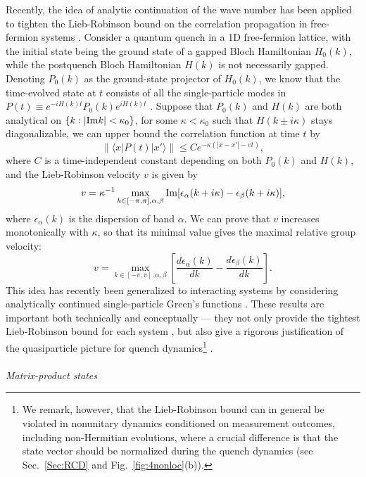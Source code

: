 \documentclass{tADP2e}
\theoremstyle{plain}
\theoremstyle{plain}
\theoremstyle{definition}
\begin{document}
Recently, the idea of analytic continuation of the wave number has been applied to {tighten} the %
Lieb-Robinson bound on the correlation propagation in free-fermion systems \cite{ZG2019}. Consider a quantum quench in a 1D free-fermion lattice, with the initial state being the ground state of a gapped Bloch Hamiltonian $H_0(k)$, while the postquench Bloch Hamiltonian $H(k)$ is not necessarily gapped. Denoting $P_0(k)$ as the ground-state projector of $H_0(k)$, we know that the time-evolved state at $t$ consists of all the single-particle modes in $P(t)\equiv e^{-iH(k)t}P_0(k)e^{iH(k)t}$ \cite{GZ18}. Suppose that $P_0(k)$ and $H(k)$ are both analytical on $\{k:|{\rm Im}k|<\kappa_0\}$, for some $\kappa<\kappa_0$ such that $H(k\pm i\kappa)$ stays diagonalizable, we can upper bound the correlation function at time $t$ by \cite{ZG2019}
\begin{equation}
\|\langle x| P(t) | x'\rangle\|\le C e^{-\kappa (|x-x'|-vt)},
\end{equation}
where $C$ is a time-independent constant depending on both $P_0(k)$ and $H(k)$, and the Lieb-Robinson velocity $v$ is given by
\begin{equation}
v=\kappa^{-1}\max_{k\in[-\pi,\pi],\alpha,\beta}{\rm Im}[\epsilon_\alpha(k+i\kappa)-\epsilon_\beta(k+i\kappa)],
\end{equation}
where $\epsilon_\alpha(k)$ is the dispersion of band $\alpha$. We can prove that $v$ increases monotonically with $\kappa$, so that its minimal value gives the maximal {relative} group velocity:
\begin{equation}
v=\max_{k\in[-\pi,\pi],\alpha,\beta}\left[\frac{d\epsilon_\alpha(k)}{dk}-\frac{d\epsilon_\beta(k)}{dk}\right].
\label{vkappa}
\end{equation} 
This idea has recently been generalized to interacting systems by considering analytically continued single-particle Green's functions \cite{ZW19}. These results are important both technically and conceptually --- they not only provide the tightest Lieb-Robinson bound for each system \cite{ZW19}, but also give a rigorous justification of the quasiparticle picture for quench dynamics\footnote{We remark, however, that the Lieb-Robinson bound can in general be violated in nonunitary dynamics conditioned on measurement outcomes, including non-Hermitian evolutions, where a crucial difference is that the state vector should be normalized during the quench dynamics  \cite{YA18,DB19} (see Sec.~\ref{Sec:RCD} and Fig.~\ref{fig:4nonloc}(b)).} \cite{EA15}.
\\ \\ {\it Matrix-product states}
\end{document}
